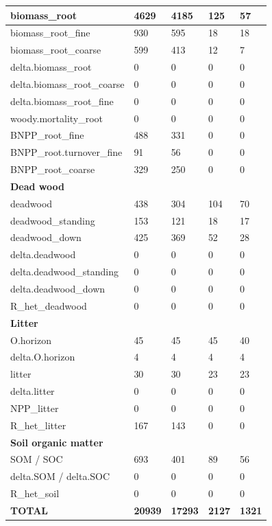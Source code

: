 \documentclass[, manuscript]{copernicus}
\begin{document}
\begin{longtable}[t]{l|l|l|l|l}
\hline
biomass\_root & 4629 & 4185 & 125 & 57\\
\hline
biomass\_root\_fine & 930 & 595 & 18 & 18\\
\hline
biomass\_root\_coarse & 599 & 413 & 12 & 7\\
\hline
delta.biomass\_root & 0 & 0 & 0 & 0\\
\hline
delta.biomass\_root\_coarse & 0 & 0 & 0 & 0\\
\hline
delta.biomass\_root\_fine & 0 & 0 & 0 & 0\\
\hline
woody.mortality\_root & 0 & 0 & 0 & 0\\
\hline
BNPP\_root\_fine & 488 & 331 & 0 & 0\\
\hline
BNPP\_root.turnover\_fine & 91 & 56 & 0 & 0\\
\hline
BNPP\_root\_coarse & 329 & 250 & 0 & 0\\
\hline
\textbf{Dead wood} & \textbf{} & \textbf{} & \textbf{} & \textbf{}\\
\hline
deadwood & 438 & 304 & 104 & 70\\
\hline
deadwood\_standing & 153 & 121 & 18 & 17\\
\hline
deadwood\_down & 425 & 369 & 52 & 28\\
\hline
delta.deadwood & 0 & 0 & 0 & 0\\
\hline
delta.deadwood\_standing & 0 & 0 & 0 & 0\\
\hline
delta.deadwood\_down & 0 & 0 & 0 & 0\\
\hline
R\_het\_deadwood & 0 & 0 & 0 & 0\\
\hline
\textbf{Litter} & \textbf{} & \textbf{} & \textbf{} & \textbf{}\\
\hline
O.horizon & 45 & 45 & 45 & 40\\
\hline
delta.O.horizon & 4 & 4 & 4 & 4\\
\hline
litter & 30 & 30 & 23 & 23\\
\hline
delta.litter & 0 & 0 & 0 & 0\\
\hline
NPP\_litter & 0 & 0 & 0 & 0\\
\hline
R\_het\_litter & 167 & 143 & 0 & 0\\
\hline
\textbf{Soil organic matter} & \textbf{} & \textbf{} & \textbf{} & \textbf{}\\
\hline
SOM / SOC & 693 & 401 & 89 & 56\\
\hline
delta.SOM / delta.SOC & 0 & 0 & 0 & 0\\
\hline
R\_het\_soil & 0 & 0 & 0 & 0\\
\hline
\textbf{TOTAL} & \textbf{20939} & \textbf{17293} & \textbf{2127} & \textbf{1321}\\
\hline
\end{longtable}
\endgroup{}
\end{document}
